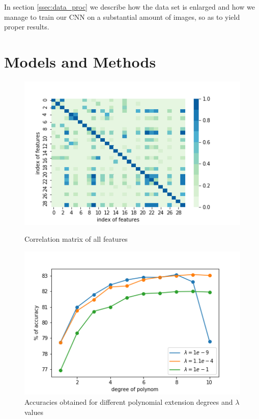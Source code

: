 \documentclass[10pt,conference,compsocconf]{IEEEtran}
\begin{document}
In section \ref{ssec:data_proc} we describe how the data set is enlarged and how we manage to train our CNN on a substantial amount of images, so as to yield proper results.


\section{Models and Methods}
\label{sec:methods}

\begin{figure}[h]
	\centering
	\begin{minipage}[b]{0.48\linewidth}
		\includegraphics[width=\textwidth]{correlation.png}
		\captionsetup{aboveskip=0.4cm,justification=centering, margin=0.1cm, labelfont=footnotesize, textfont=footnotesize}
		\caption{Correlation matrix of all features}
		\label{fig:correlation}
	\end{minipage}
	\hspace{0.05cm}
	\begin{minipage}[b]{0.48\linewidth}
		\includegraphics[width=\textwidth]{grid_search.png}
		\captionsetup{aboveskip=0.1cm,justification=centering, margin=0.1cm, labelfont=footnotesize, textfont=footnotesize}
		\caption{Accuracies obtained for different polynomial extension degrees and $\lambda$ values}
		\label{fig:grid_search}
	\end{minipage}
\end{figure}
\end{document}
